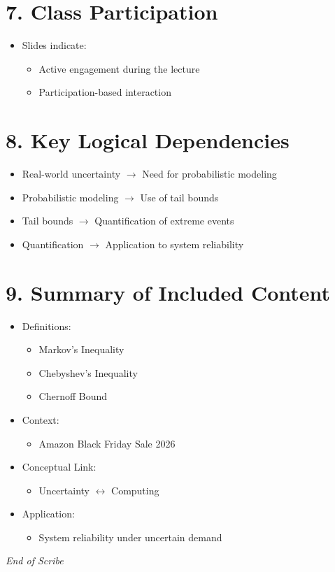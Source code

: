 \documentclass[12pt]{article}
\begin{document}
\section*{7. Class Participation}

\begin{itemize}
    \item Slides indicate:
    \begin{itemize}
        \item Active engagement during the lecture  
        \item Participation-based interaction  
    \end{itemize}
\end{itemize}

\section*{8. Key Logical Dependencies}

\begin{itemize}
    \item Real-world uncertainty $\rightarrow$ Need for probabilistic modeling  
    \item Probabilistic modeling $\rightarrow$ Use of tail bounds  
    \item Tail bounds $\rightarrow$ Quantification of extreme events  
    \item Quantification $\rightarrow$ Application to system reliability  
\end{itemize}

\section*{9. Summary of Included Content}

\begin{itemize}
    \item Definitions:
    \begin{itemize}
        \item Markov’s Inequality  
        \item Chebyshev’s Inequality  
        \item Chernoff Bound  
    \end{itemize}
    \item Context:
    \begin{itemize}
        \item Amazon Black Friday Sale 2026  
    \end{itemize}
    \item Conceptual Link:
    \begin{itemize}
        \item Uncertainty $\leftrightarrow$ Computing  
    \end{itemize}
    \item Application:
    \begin{itemize}
        \item System reliability under uncertain demand  
    \end{itemize}
\end{itemize}

\vspace{0.5cm}

\noindent \textit{End of Scribe}
\end{document}
